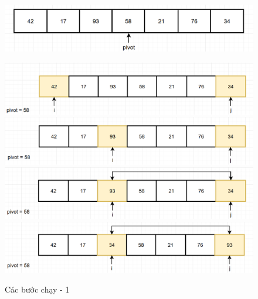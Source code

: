 \begin{figure}[H]
    \centering
    \includegraphics[width=1\linewidth]{img/quick_sort/1.png}
    
    \vspace{0.5cm}
    \includegraphics[width=1\linewidth]{img/quick_sort/2.png}
    \vspace{0.5cm}
    \includegraphics[width=1\linewidth]{img/quick_sort/3.png}
    \vspace{0.5cm}
    \includegraphics[width=1\linewidth]{img/quick_sort/4.png}
    \vspace{0.5cm}
    \includegraphics[width=1\linewidth]{img/quick_sort/5.png}
    \caption{Các bước chạy - 1}
\end{figure}

